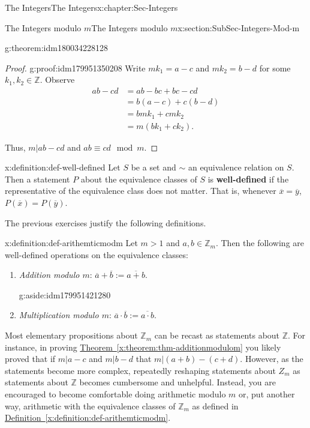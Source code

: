 \documentclass[oneside,10pt,]{book}
\newcommand{\xreffont}{\relax}
\newcommand{\terminology}[1]{\textbf{#1}}
\numberwithin{equation}{section}
\def\Z{{\mathbb Z}}
\newcommand{\amp}{&}
\begin{document}
\begin{chapterptx}{The Integers}{}{The Integers}{}{}{x:chapter:Sec-Integers}
\begin{sectionptx}{The Integers modulo \(m\)}{}{The Integers modulo \(m\)}{}{}{x:section:SubSec-Integers-Mod-m}
\begin{theorem}{}{}{g:theorem:idm180034228128}
\end{theorem}
\begin{proof}{}{g:proof:idm179951350208}
Write \(mk_1 = a-c\) and \(m k_2 = b-d\) for some \(k_1,k_2\in \Z\). Observe%
\begin{align*}
ab -cd \amp = ab - bc + bc - cd\\
\amp = b(a-c) + c(b-d)\\
\amp = bmk_1 + cmk_2\\
\amp = m(bk_1 + ck_2)\text{.}
\end{align*}
%
\par
Thus, \(m|ab-cd\) and \(ab \equiv cd\mod m\).%
\end{proof}
\begin{definition}{}{x:definition:def-well-defined}%
%
Let \(S\) be a set and \(\sim\) an equivalence relation on \(S\). Then a statement \(P\) about the equivalence classes of \(S\) is \terminology{well-defined} if the representative of the equivalence class does not matter. That is, whenever \(\overline{x} = \overline{y}\), \(P(\overline{x}) = P(\overline{y})\).%
\end{definition}
The previous exercises justify the following definitions.%
\begin{definition}{}{x:definition:def-arithemticmodm}%
Let \(m > 1\) and \(a,b\in \Z_m\). Then the following are well-defined operations on the equivalence classes:%
\begin{enumerate}
\item{}\emph{Addition modulo \(m\)}: \(\overline{a} + \overline{b} := \overline{a+b}\). \begin{aside}{}{g:aside:idm179951421280}%
\end{aside}
%
\item{}\emph{Multiplication modulo \(m\)}: \(\overline{a}\cdot \overline{b} := \overline{a\cdot b}\).%
\end{enumerate}
%
\end{definition}
Most elementary propositions about \(\Z_m\) can be recast as statements about \(\Z\). For instance, in proving \hyperref[x:theorem:thm-additionmodulom]{Theorem~{\xreffont\ref{x:theorem:thm-additionmodulom}}} you likely proved that if \(m|a-c\) and \(m|b-d\) that \(m|(a+b)-(c+d)\). However, as the statements become more complex, repeatedly reshaping statements about \(Z_m\) as statements about \(\Z\) becomes cumbersome and unhelpful. Instead, you are encouraged to become comfortable doing arithmetic modulo \(m\) or, put another way, arithmetic with the equivalence classes of \(\Z_m\) as defined in \hyperref[x:definition:def-arithemticmodm]{Definition~{\xreffont\ref{x:definition:def-arithemticmodm}}}.%

\end{sectionptx}
\end{chapterptx}
\end{document}
